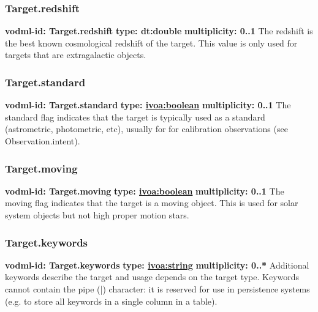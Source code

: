     \subsubsection{Target.redshift}
      \textbf{vodml-id: Target.redshift} \newline
      \textbf{type: dt:double} \newline
      \textbf{multiplicity: 0..1} \newline
      The redshift is the best known cosmological redshift of the target. This value is only used for targets that are extragalactic objects.

    \subsubsection{Target.standard}
      \textbf{vodml-id: Target.standard} \newline
      \textbf{type: \hyperref[sect:ivoa]{ivoa:boolean}} \newline
      \textbf{multiplicity: 0..1} \newline
      The standard flag indicates that the target is typically used as a standard (astrometric, photometric, etc), usually for for calibration observations (see Observation.intent).

    \subsubsection{Target.moving}
      \textbf{vodml-id: Target.moving} \newline
      \textbf{type: \hyperref[sect:ivoa]{ivoa:boolean}} \newline
      \textbf{multiplicity: 0..1} \newline
      The moving flag indicates that the target is a moving object. This is used for solar system objects but not high proper motion stars.

    \subsubsection{Target.keywords}
      \textbf{vodml-id: Target.keywords} \newline
      \textbf{type: \hyperref[sect:ivoa]{ivoa:string}} \newline
      \textbf{multiplicity: 0..*} \newline
      Additional keywords describe the target and usage depends on the target type. Keywords cannot contain the pipe (|) character: it is reserved for use in persistence systems (e.g. to store all keywords in a single column in a table).

